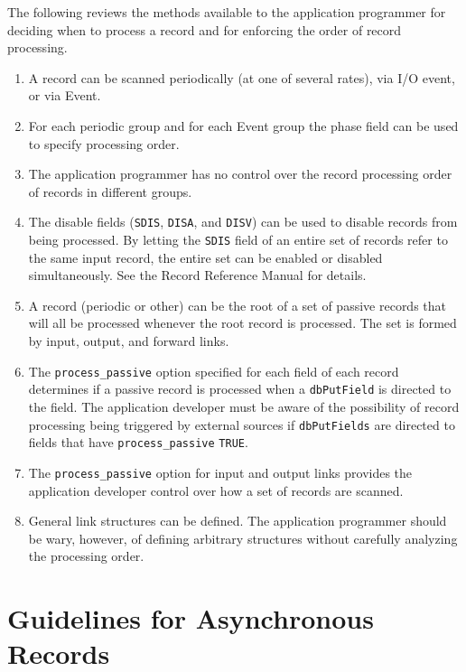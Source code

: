The following reviews the methods available to the application programmer for deciding when to process a record and for 
enforcing the order of record processing.

\begin{enumerate}\item A record can be scanned periodically (at one of several rates), via I/O event, or via Event.

\item For each periodic group and for each Event group the phase field can be used to specify processing order.

\item The application programmer has no control over the record processing order of records in different groups.

\item The disable fields (\verb|SDIS|, \verb|DISA|, and \verb|DISV|) can be used to disable records from being processed. By letting the 
\verb|SDIS| field of an entire set of records refer to the same input record, the entire set can be enabled or disabled 
simultaneously. See the Record Reference Manual for details.

\item A record (periodic or other) can be the root of a set of passive records that will all be processed whenever the root 
record is processed. The set is formed by input, output, and forward links.

\item The \verb|process_passive| option specified for each field of each record determines if a passive record is processed 
when a \verb|dbPutField| is directed to the field. The application developer must be aware of the possibility of record 
processing being triggered by external sources if \verb|dbPutFields| are directed to fields that have 
\verb|process_passive| \verb|TRUE|.

\item The \verb|process_passive| option for input and output links provides the application developer control over how a 
set of records are scanned.

\item General link structures can be defined. The application programmer should be wary, however, of defining arbitrary 
structures without carefully analyzing the processing order. 

\end{enumerate}\section{Guidelines for Asynchronous Records}

